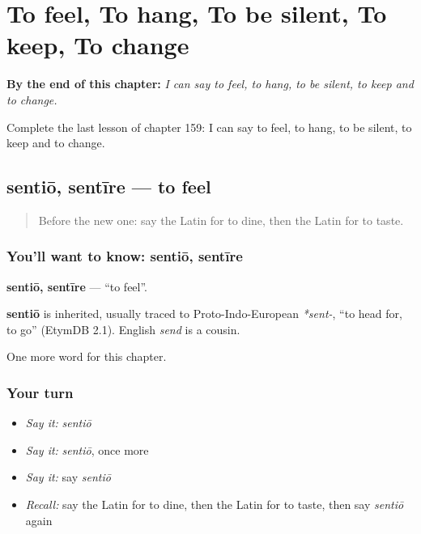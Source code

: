 
\chapter{To feel, To hang, To be silent, To keep, To change}
\label{ch:la-to-feel-to-hang-to-be-silent-to-keep-to-change}

\begin{chapteropening}
\textbf{By the end of this chapter:} \emph{I can say to feel, to hang, to be silent, to keep and to change.}

Complete the last lesson of chapter 159: I can say to feel, to hang, to be silent, to keep and to change.
\end{chapteropening}

\section[sentiō, sentīre]{sentiō, sentīre — to feel}

\label{lesson:LA-C159-sentio}



\begin{quote}
Before the new one: say the Latin for to dine, then the Latin for to taste.
\end{quote}

\subsection*{You'll want to know: sentiō, sentīre}
\textbf{sentiō, sentīre} — \textquotedblleft{}to feel\textquotedblright{}.

\begin{cousinweb}
\textbf{sentiō} is inherited, usually traced to Proto-Indo-European \emph{*sent-}, \textquotedblleft{}to head for, to go\textquotedblright{} (EtymDB 2.1). English \emph{send} is a cousin.
\end{cousinweb}

\begin{grammarlens}[title={What you've built}]
One more word for this chapter.
\end{grammarlens}

\subsection*{Your turn}
\begin{itemize}
\raggedright
  \item \emph{Say it:} \emph{sentiō}
  \item \emph{Say it:} \emph{sentiō}, once more
  \item \emph{Say it:} say \emph{sentiō}
  \item \emph{Recall:} say the Latin for to dine, then the Latin for to taste, then say \emph{sentiō} again
\end{itemize}

